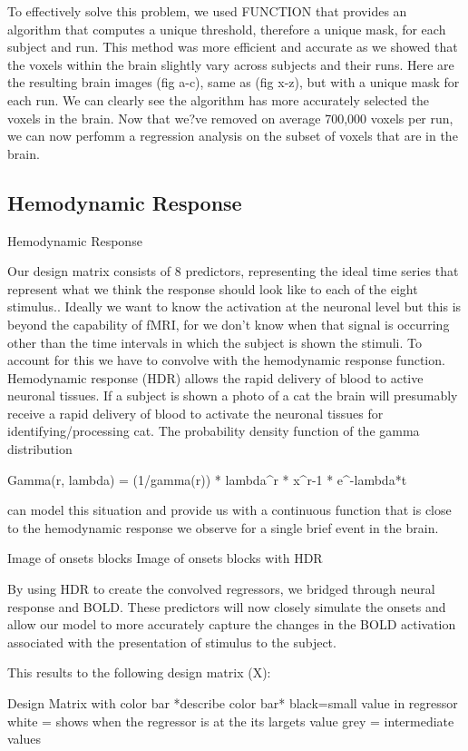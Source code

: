 \documentclass[11pt]{article}
\begin{document}
To effectively solve this problem, we used FUNCTION that provides an algorithm that computes a unique threshold, therefore a unique mask, for each subject and run. This method was more efficient and accurate as we showed that the voxels within the brain slightly vary  across subjects and their runs. Here are the resulting brain images (fig a-c), same as (fig x-z), but with a unique mask for each run. We can clearly see the algorithm has  more accurately selected the voxels in the brain. Now that we?ve removed on average 700,000 voxels per run, we can now perfomm a regression analysis on the subset of voxels that are in the brain.              
\subsection{Hemodynamic Response}
Hemodynamic Response

Our design matrix consists of 8 predictors, representing the ideal time series that represent what we think the response should look like to each of the eight stimulus.. Ideally we want to know the activation at the neuronal level but this is beyond the capability of fMRI, for we don’t know when that signal is occurring other than the time intervals in which the subject is shown the stimuli. To account for this we have to convolve with the hemodynamic response function. Hemodynamic response (HDR) allows the rapid delivery of blood to active neuronal tissues. If a subject is shown a photo of a cat the brain will presumably receive a rapid delivery of blood to activate the neuronal tissues for identifying/processing cat. The probability density function of the gamma distribution
	
	         Gamma(r, lambda) = (1/gamma(r)) * lambda^r * x^r-1 * e^-lambda*t

can model this situation and provide us with a continuous function that is close to the hemodynamic response we observe for a single brief event in the brain.

			  	Image of onsets blocks
				Image of onsets blocks with HDR

By using HDR to create the convolved regressors, we bridged through neural response and BOLD. These predictors will now closely simulate the onsets and allow our model to more accurately capture the changes in the BOLD activation associated with the presentation of stimulus to the subject.


  This results to the following design matrix (X):

                                       Design Matrix with color bar  *describe color bar*
                                       black=small value in regressor
                                       white = shows when the regressor is at the its largets value
			     grey = intermediate values
\end{document}
